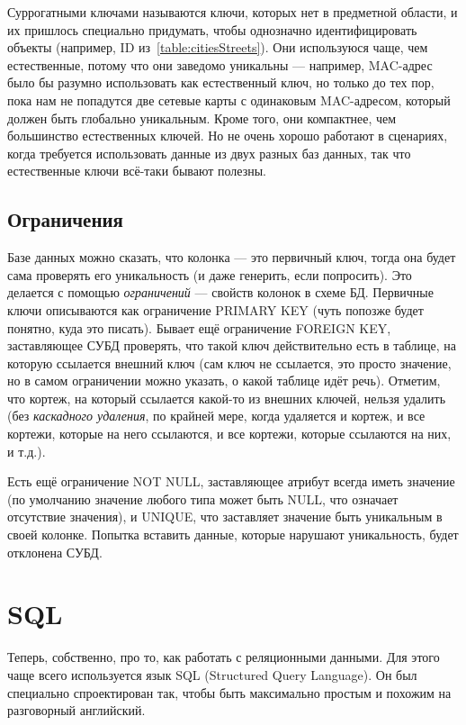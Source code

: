 \documentclass[a5paper]{article}
\begin{document}
Суррогатными ключами называются ключи, которых нет в предметной области, и их пришлось специально придумать, чтобы однозначно идентифицировать объекты (например, ID из~\ref{table:citiesStreets}). Они используюся чаще, чем естественные, потому что они заведомо уникальны --- например, MAC-адрес было бы разумно использовать как естественный ключ, но только до тех пор, пока нам не попадутся две сетевые карты с одинаковым MAC-адресом, который должен быть глобально уникальным. Кроме того, они компактнее, чем большинство естественных ключей. Но не очень хорошо работают в сценариях, когда требуется использовать данные из двух разных баз данных, так что естественные ключи всё-таки бывают полезны.

\subsection{Ограничения}

Базе данных можно сказать, что колонка --- это первичный ключ, тогда она будет сама проверять его уникальность (и даже генерить, если попросить). Это делается с помощью \textit{ограничений} --- свойств колонок в схеме БД. Первичные ключи описываются как ограничение PRIMARY KEY (чуть попозже будет понятно, куда это писать). Бывает ещё ограничение FOREIGN KEY, заставляющее СУБД проверять, что такой ключ действительно есть в таблице, на которую ссылается внешний ключ (сам ключ не ссылается, это просто значение, но в самом ограничении можно указать, о какой таблице идёт речь). Отметим, что кортеж, на который ссылается какой-то из внешних ключей, нельзя удалить (без \textit{каскадного удаления}, по крайней мере, когда удаляется и кортеж, и все кортежи, которые на него ссылаются, и все кортежи, которые ссылаются на них, и т.д.).

Есть ещё ограничение NOT NULL, заставляющее атрибут всегда иметь значение (по умолчанию значение любого типа может быть NULL, что означает отсутствие значения), и UNIQUE, что заставляет значение быть уникальным в своей колонке. Попытка вставить данные, которые нарушают уникальность, будет отклонена СУБД.

\section{SQL}

Теперь, собственно, про то, как работать с реляционными данными. Для этого чаще всего используется язык SQL (Structured Query Language). Он был специально спроектирован так, чтобы быть максимально простым и похожим на разговорный английский. 
\end{document}
